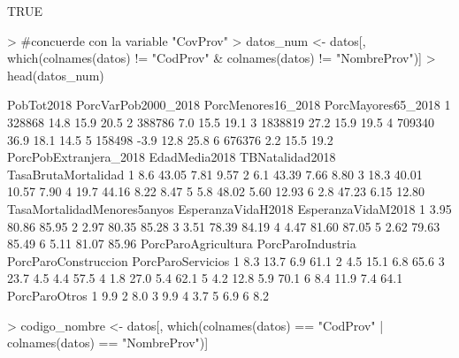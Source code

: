 \documentclass[11pt]{article}
\begin{document}
\begin{Schunk}
\begin{Soutput}
[1] TRUE
\end{Soutput}
\begin{Sinput}
> #concuerde con la variable "CovProv"
> datos_num <- datos[, which(colnames(datos) != "CodProv" & colnames(datos) != "NombreProv")]
> head(datos_num)
\end{Sinput}
\begin{Soutput}
  PobTot2018 PorcVarPob2000_2018 PorcMenores16_2018 PorcMayores65_2018
1     328868                14.8               15.9               20.5
2     388786                 7.0               15.5               19.1
3    1838819                27.2               15.9               19.5
4     709340                36.9               18.1               14.5
5     158498                -3.9               12.8               25.8
6     676376                 2.2               15.5               19.2
  PorcPobExtranjera_2018 EdadMedia2018 TBNatalidad2018 TasaBrutaMortalidad
1                    8.6         43.05            7.81                9.57
2                    6.1         43.39            7.66                8.80
3                   18.3         40.01           10.57                7.90
4                   19.7         44.16            8.22                8.47
5                    5.8         48.02            5.60               12.93
6                    2.8         47.23            6.15               12.80
  TasaMortalidadMenores5anyos EsperanzaVidaH2018 EsperanzaVidaM2018
1                        3.95              80.86              85.95
2                        2.97              80.35              85.28
3                        3.51              78.39              84.19
4                        4.47              81.60              87.05
5                        2.62              79.63              85.49
6                        5.11              81.07              85.96
  PorcParoAgricultura PorcParoIndustria PorcParoConstruccion PorcParoServicios
1                 8.3              13.7                  6.9              61.1
2                 4.5              15.1                  6.8              65.6
3                23.7               4.5                  4.4              57.5
4                 1.8              27.0                  5.4              62.1
5                 4.2              12.8                  5.9              70.1
6                 8.4              11.9                  7.4              64.1
  PorcParoOtros
1           9.9
2           8.0
3           9.9
4           3.7
5           6.9
6           8.2
\end{Soutput}
\begin{Sinput}
> codigo_nombre <- datos[, which(colnames(datos) == "CodProv" | colnames(datos) == "NombreProv")]
\end{Sinput}
\end{Schunk}
\end{document}
